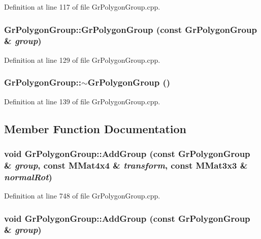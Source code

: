 Definition at line 117 of file GrPolygonGroup.cpp.\hypertarget{class_gr_polygon_group_b2c44b09732752e66e66bad26b06d65a}{
\subsubsection[{GrPolygonGroup}]{\setlength{\rightskip}{0pt plus 5cm}GrPolygonGroup::GrPolygonGroup (const {\bf GrPolygonGroup} \& {\em group})}}
\label{class_gr_polygon_group_b2c44b09732752e66e66bad26b06d65a}




Definition at line 129 of file GrPolygonGroup.cpp.\hypertarget{class_gr_polygon_group_d8d202f8e381f757ce2f9591e84b3142}{
\subsubsection[{$\sim$GrPolygonGroup}]{\setlength{\rightskip}{0pt plus 5cm}GrPolygonGroup::$\sim$GrPolygonGroup ()}}
\label{class_gr_polygon_group_d8d202f8e381f757ce2f9591e84b3142}




Definition at line 139 of file GrPolygonGroup.cpp.

\subsection{Member Function Documentation}
\hypertarget{class_gr_polygon_group_852fd667f43f1ceabf80ceb8d86168d6}{
\subsubsection[{AddGroup}]{\setlength{\rightskip}{0pt plus 5cm}void GrPolygonGroup::AddGroup (const {\bf GrPolygonGroup} \& {\em group}, \/  const {\bf MMat4x4} \& {\em transform}, \/  const {\bf MMat3x3} \& {\em normalRot})}}
\label{class_gr_polygon_group_852fd667f43f1ceabf80ceb8d86168d6}




Definition at line 748 of file GrPolygonGroup.cpp.\hypertarget{class_gr_polygon_group_3a7869b9ff3ae864be0aa71efcca2def}{
\subsubsection[{AddGroup}]{\setlength{\rightskip}{0pt plus 5cm}void GrPolygonGroup::AddGroup (const {\bf GrPolygonGroup} \& {\em group})}}
\label{class_gr_polygon_group_3a7869b9ff3ae864be0aa71efcca2def}




